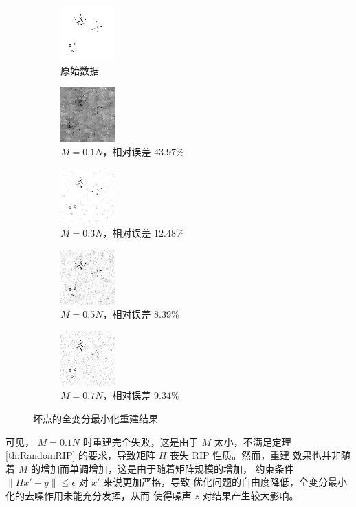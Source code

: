 \begin{figure}
\centering
\begin{subfigure}[t]{1in}
	\includegraphics{Figure/testdata/0d.png}
	\caption{原始数据}
\end{subfigure}
\begin{subfigure}[t]{1in}
	\includegraphics{Figure/TV/0d10.png}
	\caption{$M = 0.1 N$，相对误差 $43.97\%$}
\end{subfigure}
\begin{subfigure}[t]{1in}
	\includegraphics{Figure/TV/0d30.png}
	\caption{$M = 0.3 N$，相对误差 $12.48\%$}
\end{subfigure}
\begin{subfigure}[t]{1in}
	\includegraphics{Figure/TV/0d50.png}
	\caption{$M = 0.5 N$，相对误差 $8.39\%$}
\end{subfigure}
\begin{subfigure}[t]{1in}
	\includegraphics{Figure/TV/0d70.png}
	\caption{$M = 0.7 N$，相对误差 $9.34\%$}
\end{subfigure}
\caption{坏点的全变分最小化重建结果}
\label{fig:TV0d}
\end{figure}

可见， $M = 0.1 N$ 时重建完全失败，这是由于 $M$ 太小，不满足定理
\ref{th:RandomRIP} 的要求，导致矩阵 $H$ 丧失 RIP 性质。然而，重建
效果也并非随着 $M$ 的增加而单调增加，这是由于随着矩阵规模的增加，
约束条件 $\|Hx' - y\| \leq \epsilon$ 对 $x'$ 来说更加严格，导致
优化问题的自由度降低，全变分最小化的去噪作用未能充分发挥，从而
使得噪声 $z$ 对结果产生较大影响。

